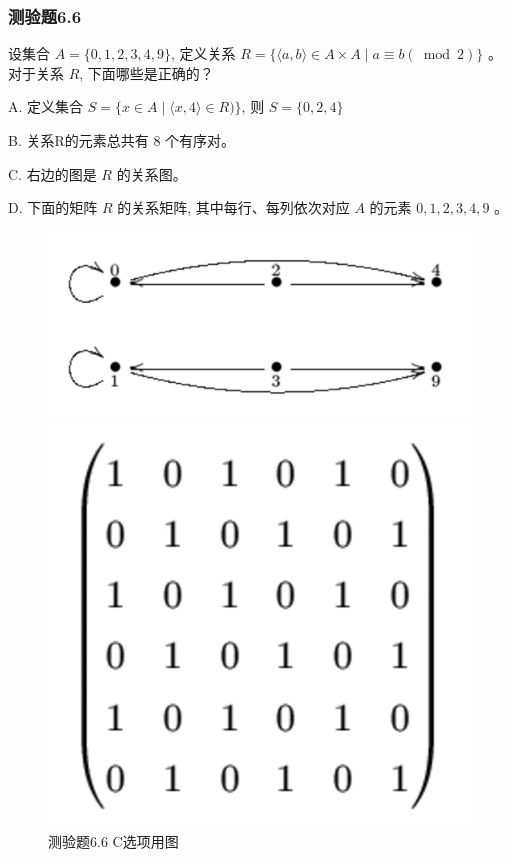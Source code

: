 \documentclass[UTF8, heading=true]{ctexart}
\begin{document}
\subsubsection{测验题6.6}

设集合 $A=\{0,1,2,3,4,9\}$, 定义关系 $R=\{\langle a, b\rangle \in A \times A \mid a \equiv b(\bmod 2)\}$ 。对于关系 $R$, 下面哪些是正确的？

A. 定义集合 $S=\{x \in A \mid\langle x, 4\rangle \in R)\}$, 则 $S=\{0,2,4\}$

B. 关系R的元素总共有 8 个有序对。

C. 右边的图是 $R$ 的关系图。

D. 下面的矩阵 $R$ 的关系矩阵, 其中每行、每列依次对应 $A$ 的元素 $0,1,2,3,4,9$ 。


\begin{figure}[H]
    \centering
    \begin{minipage}[t]{0.45\textwidth}
        \centering
        \includegraphics[width=1\textwidth]{6.6_1.jpg} %
	      \vspace{-0.3cm}
        \caption{测验题6.6 C选项用图}
    \end{minipage}
	  \hspace{0.15\textwidth} %
    \begin{minipage}[t]{0.23\textwidth}
        \centering
        \includegraphics[width=1\textwidth]{6.6_2.jpg} %

\end{minipage}
\end{figure}
\end{document}
